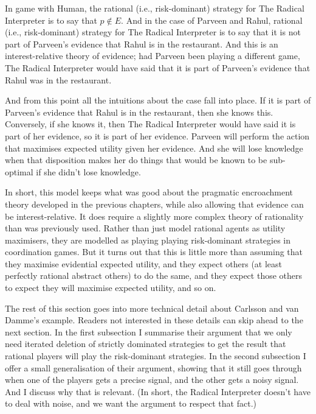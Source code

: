 \documentclass[11pt,]{book}
\begin{document}
In game with Human, the rational (i.e., risk-dominant) strategy for The Radical Interpreter is to say that \(p \notin E\). And in the case of Parveen and Rahul, rational (i.e., risk-dominant) strategy for The Radical Interpreter is to say that it is not part of Parveen's evidence that Rahul is in the restaurant. And this is an interest-relative theory of evidence; had Parveen been playing a different game, The Radical Interpreter would have said that it is part of Parveen's evidence that Rahul was in the restaurant.

And from this point all the intuitions about the case fall into place. If it is part of Parveen's evidence that Rahul is in the restaurant, then she knows this. Conversely, if she knows it, then The Radical Interpreter would have said it is part of her evidence, so it is part of her evidence. Parveen will perform the action that maximises expected utility given her evidence. And she will lose knowledge when that disposition makes her do things that would be known to be sub-optimal if she didn't lose knowledge.

In short, this model keeps what was good about the pragmatic encroachment theory developed in the previous chapters, while also allowing that evidence can be interest-relative. It does require a slightly more complex theory of rationality than was previously used. Rather than just model rational agents as utility maximisers, they are modelled as playing playing risk-dominant strategies in coordination games. But it turns out that this is little more than assuming that they maximise evidential expected utility, and they expect others (at least perfectly rational abstract others) to do the same, and they expect those others to expect they will maximise expected utility, and so on.

The rest of this section goes into more technical detail about Carlsson and van Damme's example. Readers not interested in these details can skip ahead to the next section. In the first subsection I summarise their argument that we only need iterated deletion of strictly dominated strategies to get the result that rational players will play the risk-dominant strategies. In the second subsection I offer a small generalisation of their argument, showing that it still goes through when one of the players gets a precise signal, and the other gets a noisy signal. And I discuss why that is relevant. (In short, the Radical Interpreter doesn't have to deal with noise, and we want the argument to respect that fact.)
\end{document}
